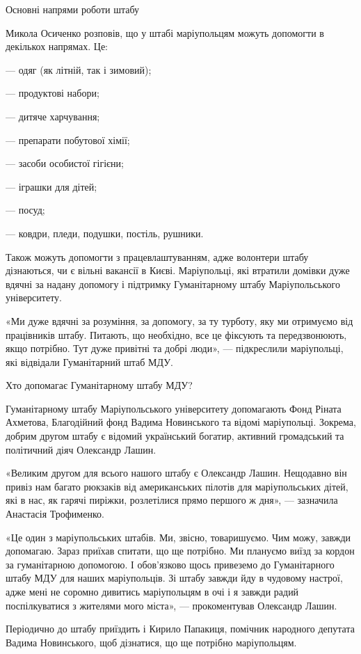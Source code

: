 Основні напрями роботи штабу

Микола Осиченко розповів, що у штабі маріупольцям можуть допомогти в декількох
напрямах. Це:

— одяг (як літній, так і зимовий);

— продуктові набори;

— дитяче харчування;

— препарати побутової хімії;

— засоби особистої гігієни;

— іграшки для дітей;

— посуд;

— ковдри, пледи, подушки, постіль, рушники.

Також можуть допомогти з працевлаштуванням, адже волонтери штабу дізнаються, чи
є вільні вакансії в Києві. Маріупольці, які втратили домівки дуже вдячні за
надану допомогу і підтримку Гуманітарному штабу Маріупольського університету.

«Ми дуже вдячні за розуміння, за допомогу, за ту турботу, яку ми отримуємо від
працівників штабу. Питають, що необхідно, все це фіксують та передзвонюють,
якщо потрібно. Тут дуже привітні та добрі люди», — підкреслили маріупольці, які
відвідали Гуманітарний штаб МДУ.

Хто допомагає Гуманітарному штабу МДУ?

Гуманітарному штабу Маріупольського університету допомагають Фонд Ріната
Ахметова, Благодійний фонд Вадима Новинського та відомі маріупольці. Зокрема,
добрим другом штабу є відомий український богатир, активний громадський та
політичний діяч Олександр Лашин.

«Великим другом для всього нашого штабу є Олександр Лашин. Нещодавно він привіз
нам багато рюкзаків від американських пілотів для маріупольських дітей, які в
нас, як гарячі пиріжки, розлетілися прямо першого ж дня», — зазначила Анастасія
Трофименко.

«Це один з маріупольських штабів. Ми, звісно, товаришуємо. Чим можу, завжди
допомагаю. Зараз приїхав спитати, що ще потрібно. Ми плануємо виїзд за кордон
за гуманітарною допомогою. І обов'язково щось привеземо до Гуманітарного штабу
МДУ для наших маріупольців. Зі штабу завжди йду в чудовому настрої, адже мені
не соромно дивитись маріупольцям в очі і я завжди радий поспілкуватися з
жителями мого міста», — прокоментував Олександр Лашин.

Періодично до штабу приїздить і Кирило Папакиця, помічник народного депутата
Вадима Новинського, щоб дізнатися, що ще потрібно маріупольцям.

